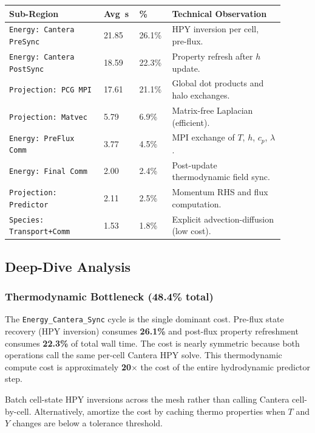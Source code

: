 \documentclass[11pt]{article}
\begin{document}
\begin{longtable}{p{0.32\linewidth}p{0.1\linewidth}p{0.1\linewidth}p{0.38\linewidth}}
\toprule
\textbf{Sub-Region} & \textbf{Avg~s} & \textbf{\%} & \textbf{Technical Observation} \\
\midrule
\texttt{Energy: Cantera PreSync} & 21.85 & 26.1\% & HPY inversion per cell, pre-flux. \\
\texttt{Energy: Cantera PostSync} & 18.59 & 22.3\% & Property refresh after $h$ update. \\
\texttt{Projection: PCG MPI} & 17.61 & 21.1\% & Global dot products and halo exchanges. \\
\texttt{Projection: Matvec} & 5.79 & 6.9\% & Matrix-free Laplacian (efficient). \\
\texttt{Energy: PreFlux Comm} & 3.77 & 4.5\% & MPI exchange of $T$, $h$, $c_p$, $\lambda$. \\
\texttt{Energy: Final Comm} & 2.00 & 2.4\% & Post-update thermodynamic field sync. \\
\texttt{Projection: Predictor} & 2.11 & 2.5\% & Momentum RHS and flux computation. \\
\texttt{Species: Transport+Comm} & 1.53 & 1.8\% & Explicit advection-diffusion (low cost). \\
\bottomrule
\end{longtable}

\subsection{Deep-Dive Analysis}

\subsubsection{Thermodynamic Bottleneck (48.4\% total)}

The \texttt{Energy\_Cantera\_Sync} cycle is the single dominant cost. Pre-flux
state recovery (HPY inversion) consumes \textbf{26.1\%} and post-flux property
refreshment consumes \textbf{22.3\%} of total wall time. The cost is nearly
symmetric because both operations call the same per-cell Cantera HPY solve.
This thermodynamic compute cost is approximately \textbf{20$\times$} the cost
of the entire hydrodynamic predictor step.

\begin{notebox}
Batch cell-state HPY inversions across the mesh rather than calling Cantera
cell-by-cell. Alternatively, amortize the cost by caching thermo properties
when $T$ and $Y$ changes are below a tolerance threshold.
\end{notebox}
\end{document}
